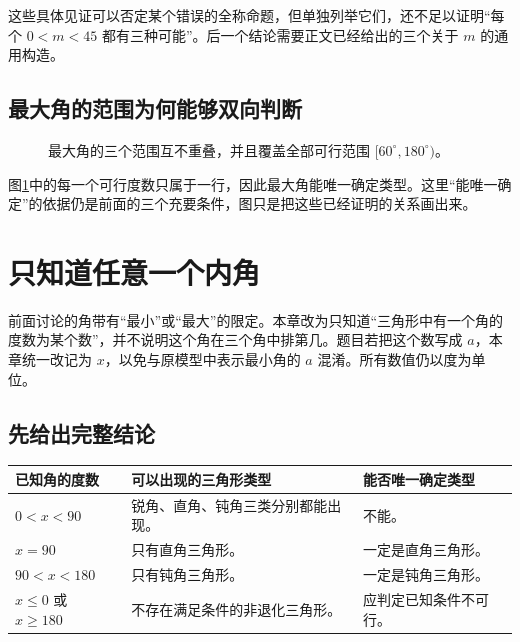 \documentclass[UTF8,a4paper,zihao=-4,oneside,openany,fontset=fandol]{ctexbook}
\theoremstyle{definition}
\theoremstyle{remark}
\begin{document}
这些具体见证可以否定某个错误的全称命题，但单独列举它们，还不足以证明“每个 $0<m<45$ 都有三种可能”。后一个结论需要正文已经给出的三个关于 $m$ 的通用构造。

\section{最大角的范围为何能够双向判断}

\begin{figure}[htbp]
\centering
{}
\caption{最大角的三个范围互不重叠，并且覆盖全部可行范围 $[60^\circ,180^\circ)$。}
\label{fig:max-ranges}
\end{figure}

图\ref{fig:max-ranges}中的每一个可行度数只属于一行，因此最大角能唯一确定类型。这里“能唯一确定”的依据仍是前面的三个充要条件，图只是把这些已经证明的关系画出来。

\chapter{只知道任意一个内角}
\label{chap:arbitrary-angle}

前面讨论的角带有“最小”或“最大”的限定。本章改为只知道“三角形中有一个角的度数为某个数”，并不说明这个角在三个角中排第几。题目若把这个数写成 $a$，本章统一改记为 $x$，以免与原模型中表示最小角的 $a$ 混淆。所有数值仍以度为单位。

\section{先给出完整结论}

\begin{center}
\begin{tabularx}{\textwidth}{|p{}|X|p{}|}
\hline
已知角的度数 & 可以出现的三角形类型 & 能否唯一确定类型\\
\hline
$0<x<90$ & 锐角、直角、钝角三类分别都能出现。 & 不能。\\
\hline
$x=90$ & 只有直角三角形。 & 一定是直角三角形。\\
\hline
$90<x<180$ & 只有钝角三角形。 & 一定是钝角三角形。\\
\hline
$x\le0$ 或 $x\ge180$ & 不存在满足条件的非退化三角形。 & 应判定已知条件不可行。\\
\hline
\end{tabularx}
\end{center}
\end{document}
